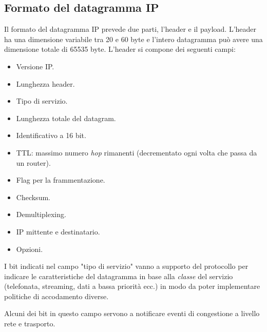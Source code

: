 \subsection{Formato del datagramma IP}
Il formato del datagramma IP prevede due parti, l'header e il payload. L'header ha una dimensione
variabile tra 20 e 60 byte e l'intero datagramma può avere una dimensione totale di 65535 byte.
L'header si compone dei seguenti campi:
\begin{itemize}
	\item Versione IP.
	\item Lunghezza header.
	\item Tipo di servizio.
	\item Lunghezza totale del datagram.
	\item Identificativo a 16 bit.
	\item TTL: massimo numero \emph{hop} rimanenti (decrementato ogni volta che passa da un 
		router).
	\item Flag per la frammentazione.
	\item Checksum.
	\item Demultiplexing.
	\item IP mittente e destinatario.
	\item Opzioni.
\end{itemize}
I bit indicati nel campo "tipo di servizio" vanno a supporto del protocollo per indicare le 
caratteristiche del datagramma in base alla \emph{classe} del servizio (telefonata, streaming, 
dati a bassa priorità ecc.) in modo da poter implementare politiche di accodamento diverse.

Alcuni dei bit in questo campo servono a notificare eventi di congestione a livello rete e 
trasporto.
